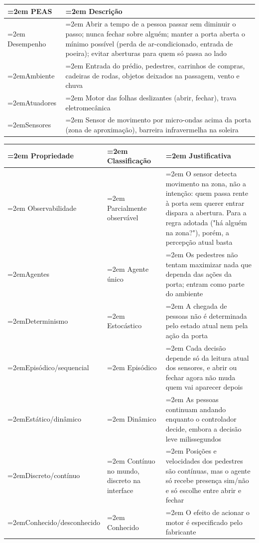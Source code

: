 \documentclass[12pt, a4paper]{article}
\begin{document}
\begingroup
\setlength{\tabcolsep}{4.0pt}
\begin{longtable}{@{}>{\raggedright\hyphenpenalty=30\tolerance=999\emergencystretch=2em\arraybackslash}p{3.90cm}>{\raggedright\hyphenpenalty=30\tolerance=999\emergencystretch=2em\arraybackslash}p{11.10cm}@{}}
\toprule\noalign{}
PEAS & Descrição \\
\midrule\noalign{}
\endhead
\bottomrule\noalign{}
\endlastfoot
Desempenho & Abrir a tempo de a pessoa passar sem diminuir o passo; nunca fechar sobre alguém; manter a porta aberta o mínimo possível (perda de ar-condicionado, entrada de poeira\allowbreak ); evitar aberturas para quem só passa ao lado \\
Ambiente & Entrada do prédio, pedestres, carrinhos de compras, cadeiras de rodas, objetos deixados na passagem, vento e chuva \\
Atuadores & Motor das folhas deslizantes (abrir, fechar\allowbreak ), trava ele\-tro\-me\-câ\-nica \\
Sensores & Sensor de movimento por micro-ondas acima da porta (zona de apro\-xi\-ma\-ção\allowbreak ), barreira infravermelha na soleira \\
\end{longtable}
\endgroup

\begingroup
\setlength{\tabcolsep}{4.0pt}
\begin{longtable}{@{}>{\raggedright\hyphenpenalty=30\tolerance=999\emergencystretch=2em\arraybackslash}p{4.50cm}>{\raggedright\hyphenpenalty=30\tolerance=999\emergencystretch=2em\arraybackslash}p{2.75cm}>{\raggedright\hyphenpenalty=30\tolerance=999\emergencystretch=2em\arraybackslash}p{7.47cm}@{}}
\toprule\noalign{}
Propriedade & Clas\-si\-fi\-ca\-ção & Justificativa \\
\midrule\noalign{}
\endhead
\bottomrule\noalign{}
\endlastfoot
Observabilidade & Parcialmente ob\-ser\-vá\-vel & O sensor detecta movimento na zona, não a intenção: quem passa rente à porta sem querer entrar dispara a abertura. Para a regra adotada ("há alguém na zona?"), porém, a percepção atual basta \\
Agentes & Agente único & Os pedestres não tentam maximizar nada que dependa das ações da porta; entram como parte do ambiente \\
Determinismo & Es\-to\-cás\-tico & A chegada de pessoas não é determinada pelo estado atual nem pela ação da porta \\
Episódico\slash sequencial & Episódico & Cada decisão depende só da leitura atual dos sensores, e abrir ou fechar agora não muda quem vai aparecer depois \\
Estático\slash dinâmico & Dinâmico & As pessoas continuam andando enquanto o controlador decide, embora a decisão leve milissegundos \\
Discreto\slash contínuo & Contínuo no mundo, discreto na interface & Posições e velocidades dos pedestres são contínuas, mas o agente só recebe presença sim\slash não e só escolhe entre abrir e fechar \\
Conhecido\slash desconhecido & Conhecido & O efeito de acionar o motor é especificado pelo fabricante \\
\end{longtable}
\endgroup
\end{document}
